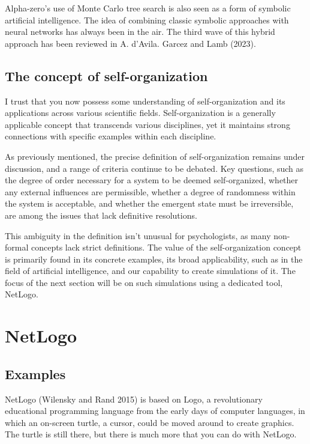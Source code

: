 \documentclass[
  a4paper,
  DIV=11,
  numbers=noendperiod,
  oneside]{scrreprt}
\begin{document}
Alpha-zero's use of Monte Carlo tree search is also seen as a form of
symbolic artificial intelligence. The idea of combining classic symbolic
approaches with neural networks has always been in the air. The third
wave of this hybrid approach has been reviewed in A. d'Avila. Garcez and
Lamb (2023).

\hypertarget{sec-The-concept-of-selforganization}{%
\subsection{The concept of
self-organization}\label{sec-The-concept-of-selforganization}}

I trust that you now possess some understanding of self-organization and
its applications across various scientific fields. Self-organization is
a generally applicable concept that transcends various disciplines, yet
it maintains strong connections with specific examples within each
discipline.

As previously mentioned, the precise definition of self-organization
remains under discussion, and a range of criteria continue to be
debated. Key questions, such as the degree of order necessary for a
system to be deemed self-organized, whether any external influences are
permissible, whether a degree of randomness within the system is
acceptable, and whether the emergent state must be irreversible, are
among the issues that lack definitive resolutions.

This ambiguity in the definition isn't unusual for psychologists, as
many non-formal concepts lack strict definitions. The value of the
self-organization concept is primarily found in its concrete examples,
its broad applicability, such as in the field of artificial
intelligence, and our capability to create simulations of it. The focus
of the next section will be on such simulations using a dedicated tool,
NetLogo.

\hypertarget{sec-NetLogo}{%
\section{NetLogo}\label{sec-NetLogo}}

\hypertarget{sec-Examples}{%
\subsection{Examples}\label{sec-Examples}}

NetLogo (Wilensky and Rand 2015) is based on Logo, a revolutionary
educational programming language from the early days of computer
languages, in which an on-screen turtle, a cursor, could be moved around
to create graphics. The turtle is still there, but there is much more
that you can do with NetLogo.
\end{document}
